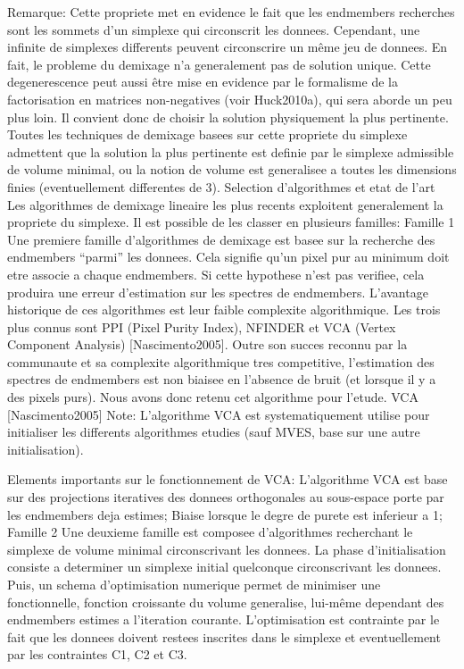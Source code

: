 Remarque: Cette propriete met en evidence le fait que les endmembers
recherches sont les sommets d'un simplexe qui circonscrit les
donnees. Cependant, une infinite de simplexes differents peuvent
circonscrire un même jeu de donnees. En fait, le probleme du demixage
n'a generalement pas de solution unique. Cette degenerescence peut
aussi être mise en evidence par le formalisme de la factorisation en
matrices non-negatives (voir Huck2010a), qui sera aborde un peu plus
loin. Il convient donc de choisir la solution physiquement la plus
pertinente. Toutes les techniques de demixage basees sur cette
propriete du simplexe admettent que la solution la plus pertinente est
definie par le simplexe admissible de volume minimal, ou la notion de
volume est generalisee a toutes les dimensions finies (eventuellement
differentes de 3).  Selection d'algorithmes et etat de l'art Les
algorithmes de demixage lineaire les plus recents exploitent
generalement la propriete du simplexe. Il est possible de les classer
en plusieurs familles: 
Famille 1 Une premiere famille d'algorithmes
de demixage est basee sur la recherche des endmembers ``parmi'' les
donnees. Cela signifie qu'un pixel pur au minimum doit etre associe a
chaque endmembers. Si cette hypothese n'est pas verifiee, cela
produira une erreur d'estimation sur les spectres de
endmembers. L'avantage historique de ces algorithmes est leur faible
complexite algorithmique. Les trois plus connus sont PPI (Pixel Purity
Index), NFINDER et VCA (Vertex Component Analysis)
[Nascimento2005]. Outre son succes reconnu par la communaute et sa
complexite algorithmique tres competitive, l'estimation des spectres
de endmembers est non biaisee en l'absence de bruit (et lorsque il y a
des pixels purs). Nous avons donc retenu cet algorithme pour l'etude.
VCA [Nascimento2005] 
Note: L'algorithme VCA est systematiquement
utilise pour initialiser les differents algorithmes etudies (sauf
MVES, base sur une autre initialisation).

Elements importants sur le fonctionnement de VCA: L'algorithme VCA
est base sur des projections iteratives des donnees orthogonales au
sous-espace porte par les endmembers deja estimes; Biaise lorsque le
degre de purete est inferieur a 1; Famille 2 Une deuxieme famille est
composee d'algorithmes recherchant le simplexe de volume minimal
circonscrivant les donnees. La phase d'initialisation consiste a
determiner un simplexe initial quelconque circonscrivant les
donnees. Puis, un schema d'optimisation numerique permet de minimiser
une fonctionnelle, fonction croissante du volume generalise, lui-même
dependant des endmembers estimes a l'iteration
courante. L'optimisation est contrainte par le fait que les donnees
doivent restees inscrites dans le simplexe et eventuellement par les
contraintes C1, C2 et C3.


